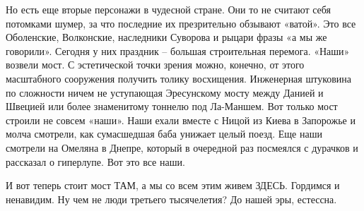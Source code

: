Но есть еще вторые персонажи в чудесной стране. Они то не считают себя
потомками шумер, за что последние их презрительно обзывают «ватой». Это все
Оболенские, Волконские, наследники Суворова и рыцари фразы «а мы же говорили».
Сегодня у них праздник – большая строительная перемога. «Наши» возвели мост. С
эстетической точки зрения можно, конечно, от этого масштабного сооружения
получить толику восхищения. Инженерная штуковина по сложности ничем не
уступающая Эресунскому мосту между Данией и Швецией или более знаменитому
тоннелю под Ла-Маншем. Вот только мост строили не совсем «наши». Наши ехали
вместе с Ницой из Киева в Запорожье и молча смотрели, как сумасшедшая баба
унижает целый поезд. Еще наши смотрели на Омеляна в Днепре, который в очередной
раз посмеялся с дурачков и рассказал о гиперлупе. Вот это все наши.

И вот теперь стоит мост ТАМ, а мы со всем этим живем ЗДЕСЬ. Гордимся и
ненавидим. Ну чем не люди третьего тысячелетия? До нашей эры, естессна.

